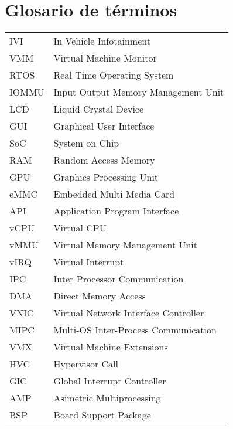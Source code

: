 \section{Glosario de términos}

\begin{tabular}{l l}
  IVI    & In Vehicle Infotainment \\
  VMM    & Virtual Machine Monitor \\
  RTOS   & Real Time Operating System \\
  IOMMU  & Input Output Memory Management Unit \\
  LCD    & Liquid Crystal Device \\
  GUI    & Graphical User Interface \\
  SoC    & System on Chip \\
  RAM    & Random Access Memory \\
  GPU    & Graphics Processing Unit \\
  eMMC   & Embedded Multi Media Card \\
  API    & Application Program Interface \\
  vCPU   & Virtual CPU \\
  vMMU   & Virtual Memory Management Unit \\
  vIRQ   & Virtual Interrupt \\
  IPC    & Inter Processor Communication \\
  DMA    & Direct Memory Access \\
  VNIC   & Virtual Network Interface Controller \\
  MIPC   & Multi-OS Inter-Process Communication \\
  VMX    & Virtual Machine Extensions \\
  HVC    & Hypervisor Call \\
  GIC    & Global Interrupt Controller \\
  AMP    & Asimetric Multiprocessing \\
  BSP    & Board Support Package \\ 
\end{tabular}



\newpage
